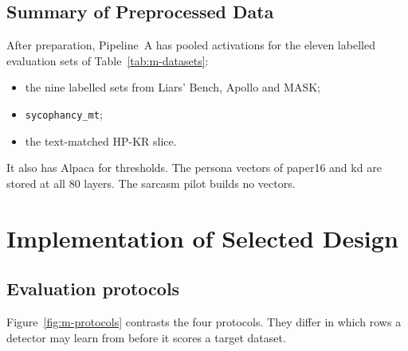 \subsection{Summary of Preprocessed Data}
\label{sec:m-data-summary}

After preparation, Pipeline~A has pooled activations for the eleven labelled evaluation sets of Table~\ref{tab:m-datasets}:
\begin{itemize}
\item the nine labelled sets from Liars' Bench, Apollo and MASK;
\item \texttt{sycophancy\_mt};
\item the text-matched HP-KR slice.
\end{itemize}
It also has Alpaca for thresholds. The persona vectors of paper16 and kd are stored at all 80 layers. The sarcasm pilot builds no vectors. %

\section{Implementation of Selected Design}
\label{sec:m-impl}

\subsection{Evaluation protocols}
\label{sec:m-protocols}

Figure~\ref{fig:m-protocols} contrasts the four protocols. They differ in which rows a detector may learn from before it scores a target dataset.

